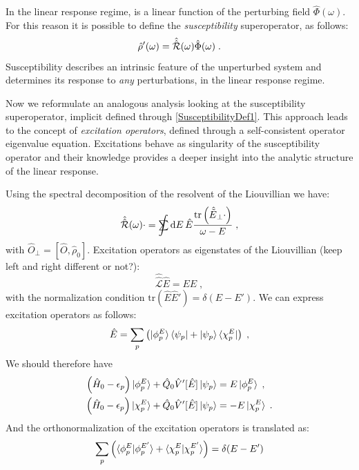 \documentclass[reprint,aps,prb]{revtex4-1}
\newcommand{\dd}{{\rm d}}
\newcommand{\eps}{\epsilon}
\newcommand{\sint}{\mathrlap{\displaystyle\int}
\mathrlap{\textstyle\sum}
\phantom{\mathrlap{\displaystyle
\int}\textstyle\sum}}
\newcommand{\be}{\begin{equation}}
\newcommand{\ee}{\end{equation}}
\newcommand{\nn}{\notag}
\newcommand{\qq}{\qquad}
\newcommand{\lb}{\label}
\newcommand{\op}[1]{\hat {#1}}
\newcommand{\sop}[1]{\op{\op {#1}}}
\newcommand{\commutator}[2]{\left[ {#1} , {#2} \right]}
\newcommand{\trace}[1]{\mathrm{tr}\left(#1\right)}
\newcommand{\opskew}[1]{{\op {#1}}_{\perp}}
\newcommand{\tket}[1]{| \tilde #1 \rangle}
\newcommand{\tbra}[1]{\langle \tilde #1 |}
\newcommand{\dmnot}{\op{\rho}_0}
\newcommand{\dm}{\op{\rho}}
\newcommand{\hnot}{\op{H}_0}
\newcommand{\Liouv}{\sop{\mathcal L}}
\begin{document}
In the linear 
response regime, is a linear function of the perturbing field $\op\Phi(\omega)$. For this reason it is possible to define the \emph{susceptibility} superoperator, as follows:
\be\lb{SusceptibilityDef1}
\dm'(\omega) = \sop{{\cal R}}(\omega) \op\Phi(\omega) \;. 
\ee
Susceptibility describes an intrinsic feature of the unperturbed system and determines its response to \emph{any} perturbations, in the linear response regime.

Now we reformulate an analogous analysis looking at the susceptibility superoperator, implicit defined through \eqref{SusceptibilityDef1}. This approach leads to the concept of \emph{excitation 
operators}, defined through a self-consistent operator eigenvalue equation. Excitations behave as singularity of the susceptibility operator and their knowledge provides a deeper insight 
into the analytic structure of the linear response. 

Using the spectral decomposition of the resolvent of the Liouvillian we have:
\be\lb{RhopExcitationDef1}
\sop{{\cal R}}(\omega) \cdot   =
\sint\dd E \, \op E
\frac{\trace{\opskew{\tilde E}\cdot}}{\omega-E} \;,
\ee
with $\opskew{O} = \commutator{\op O}{\dmnot}$. 
Excitation operators as eigenstates of the Liouvillian (keep left and right different or not?):
\be\lb{ExcitationOperatorsDef1}
\Liouv \op E = E \op E \;, %
\ee
with the normalization condition $\trace{\op E\op E'} = \delta(E-E')$. 
We can express excitation operators as follows:
\be\lb{ExcitationOperatorsDef2}
\op E = \sum_p \left( \ket{\phi^E_p}\bra{\psi_p} + \ket{\psi_p} \bra{\chi^E_p}\right)\;, 
\ee
We should therefore have
\begin{align}
\left(\hnot - \eps_p\right) \ket{\phi_p^E} + \op Q_0 \op V'[\op E] \ket{\psi_p} &= E \ket{\phi_p^E} \;, \\
\left(\hnot - \eps_p\right)\ket{\chi_p^E} + \op Q_0 \op V'[\op E] \ket{\psi_p} &= -E \ket{\chi_p^E} \;.
\end{align}
And the orthonormalization of the excitation operators is translated as: 
\be
\sum_p \left(\braket{\phi_p^E | \phi_p^{E'}} + \braket{\chi_p^E | \chi_p^{E'}}\right) = \delta(E-E')
\ee
\end{document}
